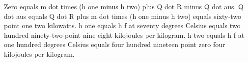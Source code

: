 Zero equals m dot times (h one minus h two) plus Q dot R minus Q dot aus. Q dot aus equals Q dot R plus m dot times (h one minus h two) equals sixty-two point one two kilowatts. h one equals h f at seventy degrees Celsius equals two hundred ninety-two point nine eight kilojoules per kilogram. h two equals h f at one hundred degrees Celsius equals four hundred nineteen point zero four kilojoules per kilogram.